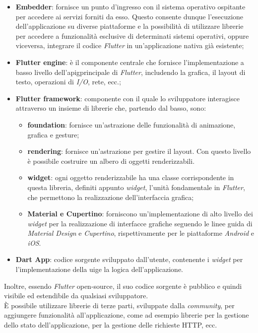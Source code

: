 \begin{itemize}
    \item \textbf{Embedder}: fornisce un punto d'ingresso con il sistema operativo ospitante per accedere ai servizi forniti da esso. Questo consente dunque l'esecuzione dell'applicazione su diverse piattaforme e la possibilità di utilizzare librerie per accedere a funzionalità esclusive di determinati sistemi operativi, oppure viceversa, integrare il codice \emph{Flutter} in un'applicazione nativa già esistente;
    \item \textbf{Flutter engine}: è il componente centrale che fornisce l'implementazione a basso livello dell'\gls{apig}\glsoccur principale di \emph{Flutter}, includendo la grafica, il layout di testo, operazioni di \emph{I/O}, rete, ecc.;
    \item \textbf{Flutter framework}: componente con il quale lo sviluppatore interagisce attraverso un insieme di librerie che, partendo dal basso, sono:
    \begin{itemize}
        \item \textbf{foundation}: fornisce un'astrazione delle funzionalità di animazione, grafica e \gls{gesture}\glsoccur;
        \item \textbf{rendering}: fornisce un'astrazione per gestire il layout. Con questo livello è possibile costruire un albero di oggetti renderizzabili.
        \item \textbf{widget}: ogni oggetto renderizzabile ha una classe corrispondente in questa libreria, definiti appunto \emph{widget}, l'unità fondamentale in \emph{Flutter}, che permettono la realizzazione dell'interfaccia grafica;
        \item \textbf{Material e Cupertino}: forniscono un'implementazione di alto livello dei \emph{widget} per la realizzazione di interfacce grafiche seguendo le linee guida di \emph{Material Design} e \emph{Cupertino}, rispettivamente per le piattaforme \emph{Android} e \emph{iOS}.
    \end{itemize}
    \item \textbf{Dart App}: codice sorgente sviluppato dall'utente, contenente i \emph{widget} per l'implementazione della \gls{uig}\glsoccur e la logica dell'applicazione.
\end{itemize}

Inoltre, essendo \emph{Flutter} \gls{open-source}\glsoccur, il suo codice sorgente è pubblico e quindi visibile ed estendibile da qualsiasi sviluppatore. \\
È possibile utilizzare librerie di terze parti, sviluppate dalla \emph{community}, per aggiungere funzionalità all'applicazione, come ad esempio librerie per la gestione dello stato dell'applicazione, per la gestione delle richieste HTTP, ecc. \\

